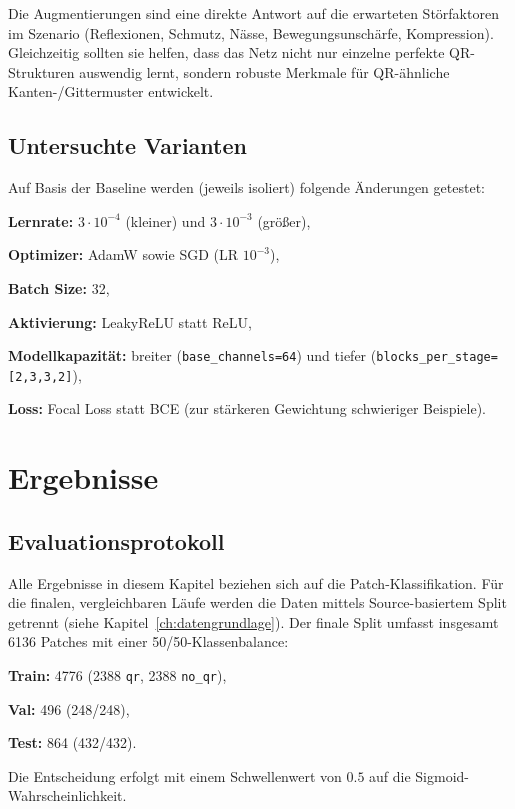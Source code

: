 Die Augmentierungen sind eine direkte Antwort auf die erwarteten Störfaktoren im Szenario (Reflexionen, Schmutz, Nässe, Bewegungsunschärfe, Kompression). Gleichzeitig sollten sie helfen, dass das Netz nicht nur einzelne \glqq perfekte\grqq{} QR-Strukturen auswendig lernt, sondern robuste Merkmale für \ac{QR}-ähnliche Kanten-/Gittermuster entwickelt.

\newpage

\subsection{Untersuchte Varianten}
\label{subsec:cnn_varianten}

Auf Basis der Baseline werden (jeweils isoliert) folgende Änderungen getestet:
\begin{listNorm}
    \item \textbf{Lernrate:} $3\cdot10^{-4}$ (kleiner) und $3\cdot10^{-3}$ (größer),
    \item \textbf{Optimizer:} AdamW sowie \ac{SGD} (LR $10^{-3}$),
    \item \textbf{Batch Size:} 32,
    \item \textbf{Aktivierung:} LeakyReLU statt ReLU,
    \item \textbf{Modellkapazität:} breiter (\texttt{base\_channels=64}) und tiefer (\texttt{blocks\_per\_stage=[2,3,3,2]}),
    \item \textbf{Loss:} Focal Loss statt \ac{BCE} (zur stärkeren Gewichtung schwieriger Beispiele).
\end{listNorm}

\section{Ergebnisse}
\label{sec:cnn_ergebnisse}

\subsection{Evaluationsprotokoll}
\label{subsec:cnn_eval_protokoll}

Alle Ergebnisse in diesem Kapitel beziehen sich auf die Patch-Klassifikation. Für die finalen, vergleichbaren Läufe werden die Daten mittels Source-basiertem Split getrennt (siehe Kapitel~\ref{ch:datengrundlage}). Der finale Split umfasst insgesamt 6136 Patches mit einer 50/50-Klassenbalance:
\begin{listNorm}
    \item \textbf{Train:} 4776 (2388 \texttt{qr}, 2388 \texttt{no\_qr}),
    \item \textbf{Val:} 496 (248/248),
    \item \textbf{Test:} 864 (432/432).
\end{listNorm}
Die Entscheidung erfolgt mit einem Schwellenwert von $0{.}5$ auf die Sigmoid-Wahrscheinlichkeit.

